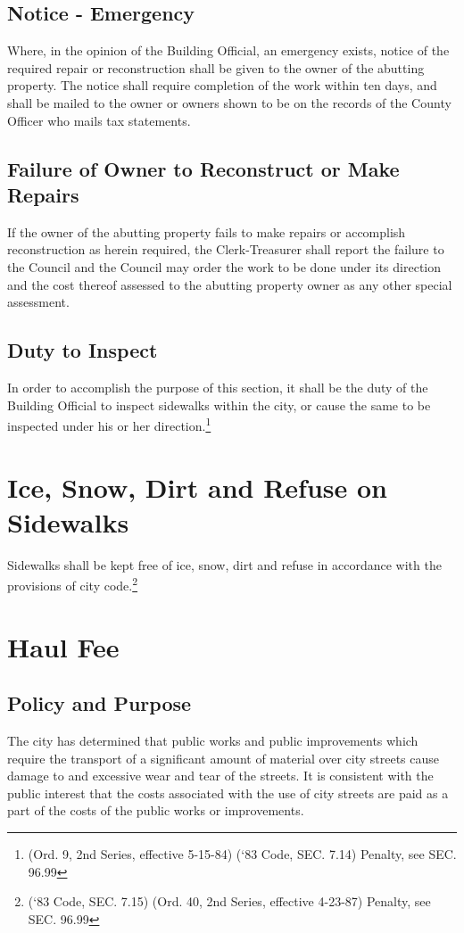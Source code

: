 \subsection{Notice - Emergency}
Where, in the opinion of the Building Official, an emergency exists, notice of the required repair or reconstruction shall be given to the owner of the abutting property.  The notice shall require completion of the work within ten days, and shall be mailed to the owner or owners shown to be on the records of the County Officer who mails tax statements.
\subsection{Failure of Owner to Reconstruct or Make Repairs}
If the owner of the abutting property fails to make repairs or accomplish reconstruction as herein required, the Clerk-Treasurer shall report the failure to the Council and the Council may order the work to be done under its direction and the cost thereof assessed to the abutting property owner as any other special assessment.
\subsection{Duty to Inspect}
In order to accomplish the purpose of this section, it shall be the duty of the Building Official to inspect sidewalks within the city, or cause the same to be inspected under his or her direction.\footnote{(Ord. 9, 2nd Series, effective 5-15-84) (‘83 Code, SEC. 7.14)  Penalty, see SEC. 96.99}
\section{Ice, Snow, Dirt and Refuse on Sidewalks}
Sidewalks shall be kept free of ice, snow, dirt and refuse in accordance with the provisions of city code.\footnote{(‘83 Code, SEC. 7.15)  (Ord. 40, 2nd Series, effective 4-23-87)  Penalty, see SEC. 96.99}
\section{Haul Fee}
\subsection{Policy and Purpose}
The city has determined that public works and public improvements which require the transport of a significant amount of material over city streets cause damage to and excessive wear and tear of the streets.  It is consistent with the public interest that the costs associated with the use of city streets are paid as a part of the costs of the public works or improvements.
